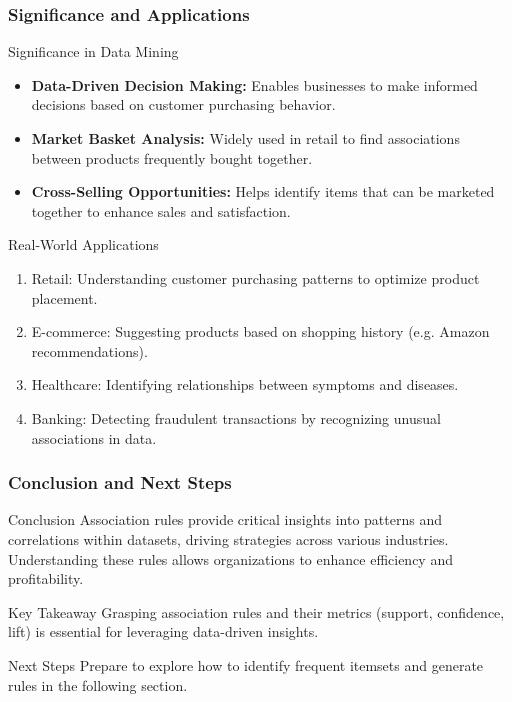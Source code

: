 \documentclass[aspectratio=169]{beamer}
\begin{document}
\begin{frame}[fragile]
    \frametitle{Significance and Applications}
    \begin{block}{Significance in Data Mining}
        \begin{itemize}
            \item \textbf{Data-Driven Decision Making:} Enables businesses to make informed decisions based on customer purchasing behavior.
            \item \textbf{Market Basket Analysis:} Widely used in retail to find associations between products frequently bought together.
            \item \textbf{Cross-Selling Opportunities:} Helps identify items that can be marketed together to enhance sales and satisfaction.
        \end{itemize}
    \end{block}
    
    \begin{block}{Real-World Applications}
        \begin{enumerate}
            \item Retail: Understanding customer purchasing patterns to optimize product placement.
            \item E-commerce: Suggesting products based on shopping history (e.g. Amazon recommendations).
            \item Healthcare: Identifying relationships between symptoms and diseases.
            \item Banking: Detecting fraudulent transactions by recognizing unusual associations in data.
        \end{enumerate}
    \end{block}
\end{frame}

\begin{frame}[fragile]
    \frametitle{Conclusion and Next Steps}
    \begin{block}{Conclusion}
        Association rules provide critical insights into patterns and correlations within datasets, driving strategies across various industries. Understanding these rules allows organizations to enhance efficiency and profitability.
    \end{block}

    \begin{block}{Key Takeaway}
        Grasping association rules and their metrics (support, confidence, lift) is essential for leveraging data-driven insights.
    \end{block}

    \begin{block}{Next Steps}
        Prepare to explore how to identify frequent itemsets and generate rules in the following section.
    \end{block}
\end{frame}
\end{document}
